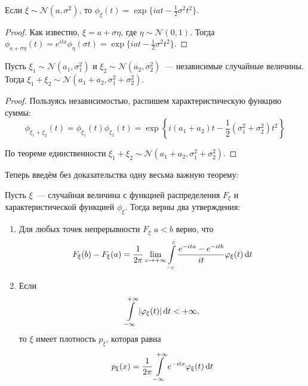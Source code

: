 \begin{consequence}
	Если \(\xi \sim \mathcal{N}(a, \sigma^2)\), то \(\phi_{\xi}(t) = \exp\{iat 
	- \frac{1}{2}\sigma^2 t^2\}\).
\end{consequence}
\begin{proof}
	Как известно, \(\xi = a + \sigma\eta\), где \(\eta \sim \mathcal{N}(0, 
	1)\). Тогда \(\phi_{a + \sigma \eta}(t) = e^{ita}\phi_{\eta}(\sigma t) = 
	\exp\{iat - \frac{1}{2}\sigma^2 t^2\}\).
\end{proof}
\begin{consequence}
	Пусть \(\xi_1 \sim \mathcal{N}(a_1, \sigma_1^2)\) и \(\xi_2 \sim 
	\mathcal{N}(a_2, \sigma_2^2)\)~--- независимые случайные величины. Тогда 
	\(\xi_1 + \xi_2 \sim \mathcal{N}(a_1 + a_2, \sigma_1^2 + \sigma_2^2)\).
\end{consequence}
\begin{proof}
	Пользуясь независимостью, распишем характеристическую функцию суммы:
	\[
		\phi_{\xi_1 + \xi_2}(t) = \phi_{\xi_1}(t)\phi_{\xi_2}(t) = 
		\exp\left\{i(a_1 + a_2)t - \frac{1}{2}(\sigma_1^2 
		+\sigma_2^2)t^2\right\}
	\]
	
	По теореме единственности \(\xi_1 + \xi_2 \sim \mathcal{N}(a_1 + a_2, 
	\sigma_1^2 + \sigma_2^2)\).
\end{proof}

Теперь введём без доказательства одну весьма важную теорему:
\begin{theorem}
	Пусть \(\xi\)~--- случайная величина с функцией распределения \(F_{\xi}\) и 
	характеристической функцией \(\phi_{\xi}\). Тогда верны два утверждения:
	\begin{enumerate}
		\item Для любых точек непрерывности \(F_{\xi}\) \(a < b\) верно, что
		\[
			F_{\xi}(b) - F_{\xi}(a) = \frac{1}{2\pi}\lim\limits_{c \to +\infty} 
			\int\limits_{-c}^{c} \frac{e^{-ita} - e^{-itb}}{it} 
			\varphi_{\xi}(t)\mathop{}\!\mathrm{d} t
		\]
		
		\item Если
		\[
			\int\limits_{-\infty}^{+\infty} |\varphi_{\xi}(t)|\mathop{}\!\mathrm{d} t < +\infty,
		\]
		то \(\xi\) имеет плотность \(p_{\xi}\), которая равна
		\[
			p_{\xi}(x) = \frac{1}{2\pi}\int\limits_{-\infty}^{+\infty} 
			e^{-itx}\varphi_{\xi}(t)\mathop{}\!\mathrm{d} t
		\]
	\end{enumerate}
\end{theorem}
